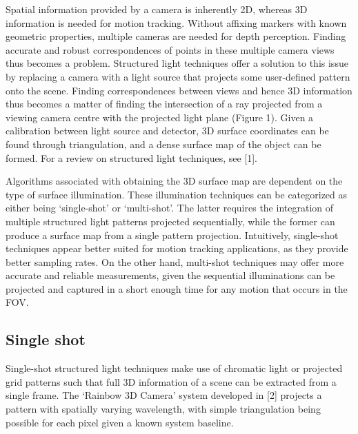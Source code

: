 \documentclass[class=article, crop=false]{standalone}
\begin{document}
Spatial information provided by a camera is inherently 2D, whereas 3D information is needed for motion tracking. Without affixing markers with known geometric properties, multiple cameras are needed for depth perception. Finding accurate and robust correspondences of points in these multiple camera views thus becomes a problem. Structured light techniques offer a solution to this issue by replacing a camera with a light source that projects some user-defined pattern onto the scene. Finding correspondences between views and hence 3D information thus becomes a matter of finding the intersection of a ray projected from a viewing camera centre with the projected light plane (Figure 1). Given a calibration between light source and detector, 3D surface coordinates can be found through triangulation, and a dense surface map of the object can be formed. For a review on structured light techniques, see [1].
\par
Algorithms associated with obtaining the 3D surface map are dependent on the type of surface illumination. These illumination techniques can be categorized as either being ‘single-shot’ or ‘multi-shot’. The latter requires the integration of multiple structured light patterns projected sequentially, while the former can produce a surface map from a single pattern projection. Intuitively, single-shot techniques appear better suited for motion tracking applications, as they provide better sampling rates. On the other hand, multi-shot techniques may offer more accurate and reliable measurements, given the sequential illuminations can be projected and captured in a short enough time for any motion that occurs in the FOV. 
\subsection{Single shot}
Single-shot structured light techniques make use of chromatic light or projected grid patterns such that full 3D information of a scene can be extracted from a single frame. The ‘Rainbow 3D Camera’ system developed in [2] projects a pattern with spatially varying wavelength, with simple triangulation being possible for each pixel given a known system baseline.

	
\end{document}
